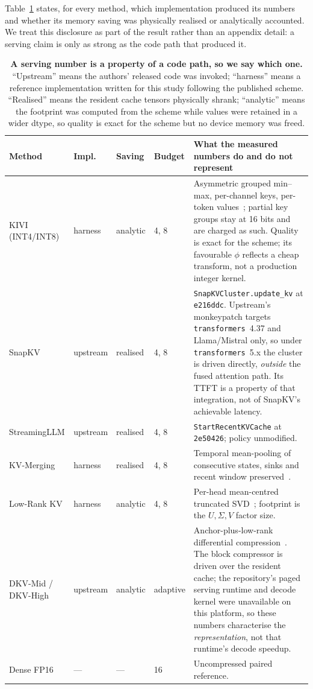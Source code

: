 \documentclass[sigplan,10pt,anonymous,review,nonacm]{acmart}
\begin{document}
Table~\ref{tab:provenance} states, for every method, which implementation
produced its numbers and whether its memory saving was physically realised or
analytically accounted. We treat this disclosure as part of the result rather
than an appendix detail: a serving claim is only as strong as the code path
that produced it.

\begin{table}[t]
\centering
\small
\setlength{\tabcolsep}{4.0pt}
\caption{\textbf{A serving number is a property of a code path, so we say
which one.} ``Upstream'' means the authors' released code was invoked;
``harness'' means a reference implementation written for this study following
the published scheme. ``Realised'' means the resident cache tensors physically
shrank; ``analytic'' means the footprint was computed from the scheme while
values were retained in a wider dtype, so quality is exact for the scheme but
no device memory was freed.}
\label{tab:provenance}
\begin{tabular}{@{}llll p{9.4cm}@{}}
\toprule
\textbf{Method} & \textbf{Impl.} & \textbf{Saving} & \textbf{Budget} & \textbf{What the measured numbers do and do not represent} \\
\midrule
KIVI (INT4/INT8) & harness & analytic & 4, 8 &
Asymmetric grouped min--max, per-channel keys, per-token
values~\cite{liu2024kivi}; partial key groups stay at 16 bits and are charged
as such. Quality is exact for the scheme; its favourable $\phi$ reflects a
cheap transform, not a production integer kernel. \\[2pt]
SnapKV & upstream & realised & 4, 8 &
\texttt{SnapKVCluster.update\_kv} at \texttt{e216ddc}. Upstream's monkeypatch
targets \texttt{transformers}~4.37 and Llama/Mistral only, so under
\texttt{transformers}~5.x the cluster is driven directly, \emph{outside} the
fused attention path. Its TTFT is a property of that integration, not of
SnapKV's achievable latency. \\[2pt]
StreamingLLM & upstream & realised & 4, 8 &
\texttt{StartRecentKVCache} at \texttt{2e50426}; policy unmodified. \\[2pt]
KV-Merging & harness & realised & 4, 8 &
Temporal mean-pooling of consecutive states, sinks and recent window
preserved~\cite{ge2023model}. \\[2pt]
Low-Rank KV & harness & analytic & 4, 8 &
Per-head mean-centred truncated SVD~\cite{sharma2023truth}; footprint is the
$U,\Sigma,V$ factor size. \\[2pt]
DKV-Mid / DKV-High & upstream & analytic & adaptive &
Anchor-plus-low-rank differential compression~\cite{dkvpreprint}. The
block compressor is driven over the resident cache; the repository's paged
serving runtime and decode kernel were unavailable on this platform, so these
numbers characterise the \emph{representation}, not that runtime's decode
speedup. \\[2pt]
Dense FP16 & --- & --- & 16 & Uncompressed paired reference. \\
\bottomrule
\end{tabular}
\end{table}
\end{document}
